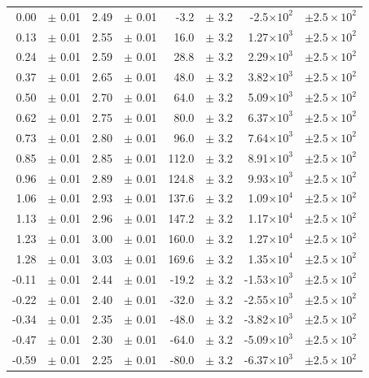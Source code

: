 \documentclass[a4paper]{article}
\begin{document}
\begin{table}[htbp]
\begin{tabular}{rlrlrlrl}
0.00 & $\pm$ 0.01 & 2.49 & $\pm$ 0.01 & -3.2 & $\pm$ 3.2 & -2.5$\times 10^{2}$ & $\pm 2.5 \times 10^{2}$  \\ 
0.13 & $\pm$ 0.01 & 2.55 & $\pm$ 0.01 & 16.0 & $\pm$ 3.2 & 1.27$\times 10^{3}$ & $\pm 2.5 \times 10^{2}$  \\ 
0.24 & $\pm$ 0.01 & 2.59 & $\pm$ 0.01 & 28.8 & $\pm$ 3.2 & 2.29$\times 10^{3}$ & $\pm 2.5 \times 10^{2}$  \\ 
0.37 & $\pm$ 0.01 & 2.65 & $\pm$ 0.01 & 48.0 & $\pm$ 3.2 & 3.82$\times 10^{3}$ & $\pm 2.5 \times 10^{2}$  \\ 
0.50 & $\pm$ 0.01 & 2.70 & $\pm$ 0.01 & 64.0 & $\pm$ 3.2 & 5.09$\times 10^{3}$ & $\pm 2.5 \times 10^{2}$  \\ 
0.62 & $\pm$ 0.01 & 2.75 & $\pm$ 0.01 & 80.0 & $\pm$ 3.2 & 6.37$\times 10^{3}$ & $\pm 2.5 \times 10^{2}$  \\ 
0.73 & $\pm$ 0.01 & 2.80 & $\pm$ 0.01 & 96.0 & $\pm$ 3.2 & 7.64$\times 10^{3}$ & $\pm 2.5 \times 10^{2}$  \\ 
0.85 & $\pm$ 0.01 & 2.85 & $\pm$ 0.01 & 112.0 & $\pm$ 3.2 & 8.91$\times 10^{3}$ & $\pm 2.5 \times 10^{2}$  \\ 
0.96 & $\pm$ 0.01 & 2.89 & $\pm$ 0.01 & 124.8 & $\pm$ 3.2 & 9.93$\times 10^{3}$ & $\pm 2.5 \times 10^{2}$  \\ 
1.06 & $\pm$ 0.01 & 2.93 & $\pm$ 0.01 & 137.6 & $\pm$ 3.2 & 1.09$\times 10^{4}$ & $\pm 2.5 \times 10^{2}$  \\ 
1.13 & $\pm$ 0.01 & 2.96 & $\pm$ 0.01 & 147.2 & $\pm$ 3.2 & 1.17$\times 10^{4}$ & $\pm 2.5 \times 10^{2}$  \\ 
1.23 & $\pm$ 0.01 & 3.00 & $\pm$ 0.01 & 160.0 & $\pm$ 3.2 & 1.27$\times 10^{4}$ & $\pm 2.5 \times 10^{2}$  \\ 
1.28 & $\pm$ 0.01 & 3.03 & $\pm$ 0.01 & 169.6 & $\pm$ 3.2 & 1.35$\times 10^{4}$ & $\pm 2.5 \times 10^{2}$  \\ 
-0.11 & $\pm$ 0.01 & 2.44 & $\pm$ 0.01 & -19.2 & $\pm$ 3.2 & -1.53$\times 10^{3}$ & $\pm 2.5 \times 10^{2}$  \\ 
-0.22 & $\pm$ 0.01 & 2.40 & $\pm$ 0.01 & -32.0 & $\pm$ 3.2 & -2.55$\times 10^{3}$ & $\pm 2.5 \times 10^{2}$  \\ 
-0.34 & $\pm$ 0.01 & 2.35 & $\pm$ 0.01 & -48.0 & $\pm$ 3.2 & -3.82$\times 10^{3}$ & $\pm 2.5 \times 10^{2}$  \\ 
-0.47 & $\pm$ 0.01 & 2.30 & $\pm$ 0.01 & -64.0 & $\pm$ 3.2 & -5.09$\times 10^{3}$ & $\pm 2.5 \times 10^{2}$  \\ 
-0.59 & $\pm$ 0.01 & 2.25 & $\pm$ 0.01 & -80.0 & $\pm$ 3.2 & -6.37$\times 10^{3}$ & $\pm 2.5 \times 10^{2}$  \\ 

\end{tabular}
\end{table}
\end{document}
